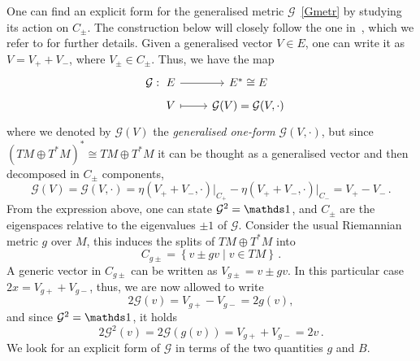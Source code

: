 \documentclass[debug]{phd}
\begin{document}
						One can find an explicit form for the generalised metric $\mathcal{G}$~\eqref{Gmetr} by studying its action on $C_{\pm}$.
						The construction below will closely follow the one in~\cite{baraglia}, which we refer to for further details.					
						Given a generalised vector $V \in E$, one can write it as $ V= V_+ + V_{-}$, where $V_{\pm} \in C_{\pm}$.
						Thus, we have the map
								\begin{equation}
									\begin{tikzcd}[row sep=tiny]
										\mathcal{G} :\!\!\!\!\!\!\!\!\!\!\!\!\!\!\!\!\!\!\!\!& E \arrow{r} & E^* \cong E \\
 																	& V \arrow[mapsto]{r} & \mathcal{G}(V) = \mathcal{G}(V, \cdot)
									\end{tikzcd}
								\end{equation}
						where we denoted by $\mathcal{G}(V)$ the \emph{generalised one-form} $\mathcal{G}(V,\cdot)$, but since $(TM \oplus T^*M )^* \cong TM \oplus T^*M$ it can be thought as a generalised vector and then decomposed in $C_{\pm}$ components,
								\begin{equation}
									\mathcal{G}(V) = \mathcal{G}(V, \cdot) = \eta( V_{+} + V_{-}, \cdot )\big|_{C_{+}} - \eta( V_{+} + V_{-}, \cdot )\big|_{C_{-}} = V_{+} - V_{-} \, .
								\end{equation}
						From the expression above, one can state $\mathcal{G}^2 = \id$, and $C_\pm$ are the eigenspaces relative to the eigenvalues $\pm 1$ of $\mathcal{G}$. 
						Consider the usual Riemannian metric $g$ over $M$, this induces the splits of $TM \oplus T^*M$ into
								\begin{equation}
									C_{g\pm} = \left\{v \pm gv \mid v \in TM \right\}\, .
								\end{equation}
						A generic vector in $C_{g\pm}$ can be written as $V_{g\pm} = v \pm g v$. 
						In this particular case $2x= V_{g+} + V_{g-}$, thus, we are now allowed to write
								\begin{equation*}
									2\mathcal{G}(v) = V_{g+} - V_{g-} = 2 g(v),
								\end{equation*}
						and since $\mathcal{G}^2 = \id$, it holds
								\begin{equation*}
									2\mathcal{G}^2(v) = 2 \mathcal{G}(g(v)) = V_{g+} + V_{g-} = 2v \, .
								\end{equation*}
						We look for an explicit form of $\mathcal{G}$ in terms of the two quantities $g$ and $B$.
\end{document}
